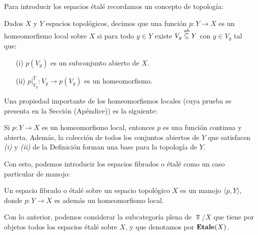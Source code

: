 Para introducir los espacios étalé recordamos un concepto de topología:
\begin{Def}\label{Def:HomeomorfismoLocal}
   Dados $X$ y $Y$ espacios topológicos, decimos que una función $p:Y\to X$ es un homeomorfismo local sobre $X$ si para todo $y\in Y$ existe $V_y\stackrel{ab}{\subseteq} Y$ con $y\in V_y$ tal que:
   \begin{itemize}
      \item[(i)] $p(V_y)$ es un subconjunto abierto de $X$.
      \item[(ii)] $p|^{Y}_{V_y}:V_y\to p(V_y)$ es un homeomorfismo. 
   \end{itemize}
\end{Def}
Una propiedad importante de los homeomorfismos locales (cuya prueba se presenta en la Sección  (Apéndice)) es la siguiente:
\begin{Prop}
   Si $p:Y\to X$ es un homeomorfismo local, entonces $p$ es una función continua y abierta. Además, la colección de todos los conjuntos abiertos de $Y$ que satisfacen \textit{(i)} y \textit{(ii)} de la Definición  forman una base para la topología de $Y$. 
\end{Prop}
Con esto, podemos introducir los espacios fibrados o étalé como un caso particular de manojo:
\begin{Def}
   Un espacio fibrado o étalé sobre un espacio topológico $X$ es un manojo $\langle p, Y\rangle$, donde $p: Y\to X$ es además un homeomorfismo local.
\end{Def}
Con lo anterior, podemos considerar la subcategoría plena de $\Top/X$ que tiene por objetos todos los espacios étalé sobre $X$, y que denotamos por $\normalfont{\textbf{Etale}}(X)$.

